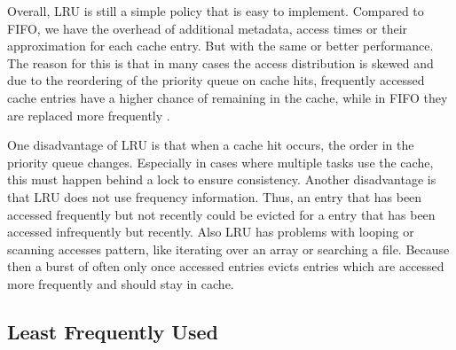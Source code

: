 \documentclass[
	12pt,
	a4paper,
	abstract,
	bibliography=totoc,
	chapterprefix,
	headings=openright,
	numbers=endperiod,
	parskip=half,
	twoside,
]{scrreprt}
\begin{document}
Overall, LRU is still a simple policy that is easy to implement.
Compared to FIFO, we have the overhead of additional metadata, access times or their approximation for each cache entry. 
But with the same or better performance.
The reason for this is that in many cases the access distribution is skewed and 
due to the reordering of the priority queue on cache hits, frequently accessed cache entries have a higher chance of remaining in the cache, while in FIFO they are replaced more frequently \cite{van1992lru}.

One disadvantage of LRU is that when a cache hit occurs, the order in the priority queue changes.
Especially in cases where multiple tasks use the cache, this must happen behind a lock to ensure consistency.
Another disadvantage is that LRU does not use frequency information.
Thus, an entry that has been accessed frequently but not recently could be evicted for a entry that has been accessed infrequently but recently.
Also LRU has problems with looping or scanning accesses pattern, like iterating over an array or searching a file.
Because then a burst of often only once accessed entries evicts entries which are accessed more frequently and should stay in cache.

\subsection{Least Frequently Used}
\end{document}
